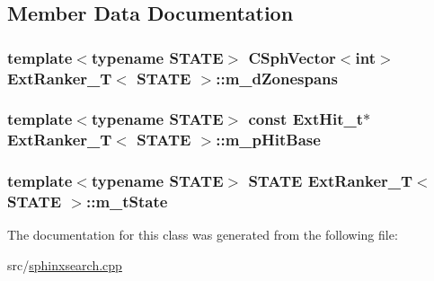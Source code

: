 \subsection{Member Data Documentation}
\hypertarget{classExtRanker__T_ab50730851677755c1067bfc4b967e057}{
\subsubsection[{m\-\_\-d\-Zonespans}]{\setlength{\rightskip}{0pt plus 5cm}template$<$typename S\-T\-A\-T\-E$>$ {\bf C\-Sph\-Vector}$<${\bf int}$>$ {\bf Ext\-Ranker\-\_\-\-T}$<$ S\-T\-A\-T\-E $>$\-::m\-\_\-d\-Zonespans\hspace{0.3cm}{\ttfamily [protected]}}}\label{classExtRanker__T_ab50730851677755c1067bfc4b967e057}
\hypertarget{classExtRanker__T_ae4e04420ed78cb0e82ee8d4e48de87b3}{
\subsubsection[{m\-\_\-p\-Hit\-Base}]{\setlength{\rightskip}{0pt plus 5cm}template$<$typename S\-T\-A\-T\-E$>$ const {\bf Ext\-Hit\-\_\-t}$\ast$ {\bf Ext\-Ranker\-\_\-\-T}$<$ S\-T\-A\-T\-E $>$\-::m\-\_\-p\-Hit\-Base\hspace{0.3cm}{\ttfamily [protected]}}}\label{classExtRanker__T_ae4e04420ed78cb0e82ee8d4e48de87b3}
\hypertarget{classExtRanker__T_a4b11599de85f4a4c4c2215b83b1c32ec}{
\subsubsection[{m\-\_\-t\-State}]{\setlength{\rightskip}{0pt plus 5cm}template$<$typename S\-T\-A\-T\-E$>$ S\-T\-A\-T\-E {\bf Ext\-Ranker\-\_\-\-T}$<$ S\-T\-A\-T\-E $>$\-::m\-\_\-t\-State\hspace{0.3cm}{\ttfamily [protected]}}}\label{classExtRanker__T_a4b11599de85f4a4c4c2215b83b1c32ec}


The documentation for this class was generated from the following file\-:\begin{DoxyCompactItemize}
\item 
src/\hyperlink{sphinxsearch_8cpp}{sphinxsearch.\-cpp}\end{DoxyCompactItemize}
